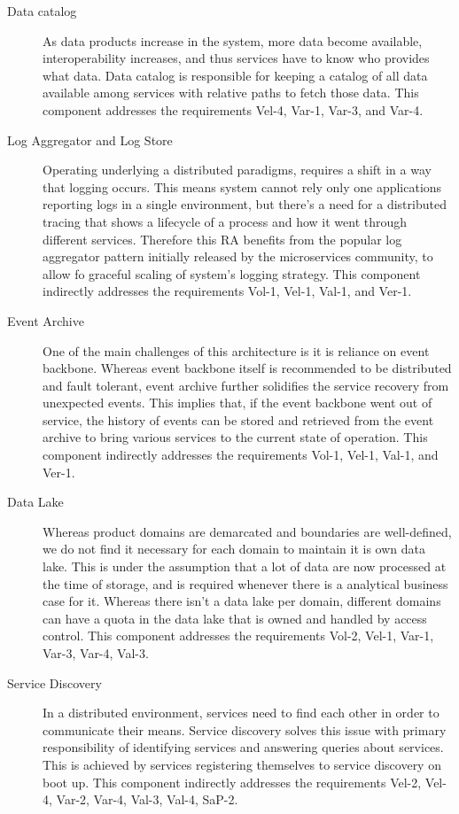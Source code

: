 \documentclass[a4paper,11pt]{article}
\begin{document}
\begin{description}
    \item[Data catalog] As data products increase in the system, more data become available, interoperability increases, and thus services have to know who provides what data. Data catalog is responsible for keeping a catalog of all data available among services with relative paths to fetch those data. This component addresses the requirements Vel-4, Var-1, Var-3, and Var-4.

    \item[Log Aggregator and Log Store] Operating underlying a distributed paradigms, requires a shift in a way that logging occurs. This means system cannot rely only one applications reporting logs in a single environment, but there's a need for a distributed tracing that shows a lifecycle of a process and how it went through different services. Therefore this RA benefits from the popular log aggregator pattern initially released by the microservices community, to allow fo graceful scaling of system's logging strategy. This component indirectly addresses the requirements Vol-1, Vel-1, Val-1, and Ver-1. 
    
    \item[Event Archive] One of the main challenges of this architecture is it is reliance on event backbone. Whereas event backbone itself is recommended to be distributed and fault tolerant, event archive further solidifies the service recovery from unexpected events. This implies that, if the event backbone went out of service, the history of events can be stored and retrieved from the event archive to bring various services to the current state of operation. This component indirectly addresses the requirements Vol-1, Vel-1, Val-1, and Ver-1. 

    \item[Data Lake] Whereas product domains are demarcated and boundaries are well-defined, we do not find it necessary for each domain to maintain it is own data lake. This is under the assumption that a lot of data are now processed at the time of storage, and is required whenever there is a analytical business case for it. Whereas there isn't a data lake per domain, different domains can have a quota in the data lake that is owned and handled by access control. This component addresses the requirements Vol-2, Vel-1, Var-1, Var-3, Var-4, Val-3.
    
    \item[Service Discovery] In a distributed environment, services need to find each other in order to communicate their means. Service discovery solves this issue with primary responsibility of identifying services and answering queries about services. This is achieved by services registering themselves to service discovery on boot up. This component indirectly addresses the requirements Vel-2, Vel-4, Var-2, Var-4, Val-3, Val-4, SaP-2. 


\end{description}
\end{document}

